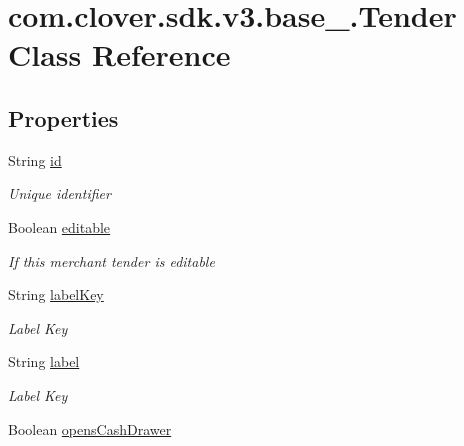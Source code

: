 \hypertarget{classcom_1_1clover_1_1sdk_1_1v3_1_1base___1_1_tender}{}\section{com.\+clover.\+sdk.\+v3.\+base\+\_\+.\+Tender Class Reference}
\label{classcom_1_1clover_1_1sdk_1_1v3_1_1base___1_1_tender}
\subsection*{Properties}
\begin{DoxyCompactItemize}
\item 
String \hyperlink{classcom_1_1clover_1_1sdk_1_1v3_1_1base___1_1_tender_af941247d43ce3daad9957f014ec3d247}{id}
\begin{DoxyCompactList}\small\item\em Unique identifier \end{DoxyCompactList}\item 
Boolean \hyperlink{classcom_1_1clover_1_1sdk_1_1v3_1_1base___1_1_tender_a1a267d95c2d3bbf07caa8b6aaa30eb7c}{editable}
\begin{DoxyCompactList}\small\item\em If this merchant tender is editable \end{DoxyCompactList}\item 
String \hyperlink{classcom_1_1clover_1_1sdk_1_1v3_1_1base___1_1_tender_a8f3038e5ea60bee2220e1714fbf97871}{label\+Key}
\begin{DoxyCompactList}\small\item\em Label Key \end{DoxyCompactList}\item 
String \hyperlink{classcom_1_1clover_1_1sdk_1_1v3_1_1base___1_1_tender_ad479f9a9cc8ea2907ab3f075f2eb873d}{label}
\begin{DoxyCompactList}\small\item\em Label Key \end{DoxyCompactList}\item 
Boolean \hyperlink{classcom_1_1clover_1_1sdk_1_1v3_1_1base___1_1_tender_aa65b267d535ae9793eb3c83240540ff9}{opens\+Cash\+Drawer}

\end{DoxyCompactItemize}

